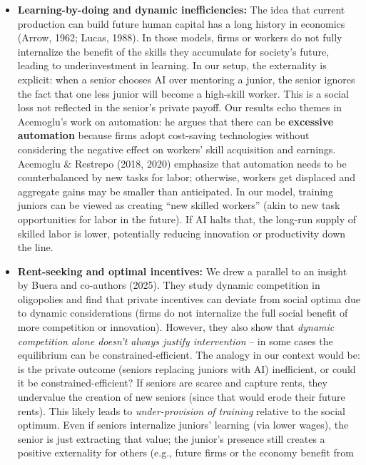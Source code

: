 \documentclass[12pt]{article}
\begin{document}
\begin{itemize}
\item
  \textbf{Learning-by-doing and dynamic inefficiencies:} The idea that
  current production can build future human capital has a long history
  in economics (Arrow, 1962; Lucas, 1988). In those models, firms or
  workers do not fully internalize the benefit of the skills they
  accumulate for society's future, leading to underinvestment in
  learning. In our setup, the externality is explicit: when a senior
  chooses AI over mentoring a junior, the senior ignores the fact that
  one less junior will become a high-skill worker. This is a social loss
  not reflected in the senior's private payoff. Our results echo themes
  in Acemoglu's work on automation: he argues that there can be
  \textbf{excessive automation} because firms adopt cost-saving
  technologies without considering the negative effect on workers' skill
  acquisition and earnings. Acemoglu \& Restrepo (2018, 2020) emphasize
  that automation needs to be counterbalanced by new tasks for labor;
  otherwise, workers get displaced and aggregate gains may be smaller
  than anticipated. In our model, training juniors can be viewed as
  creating ``new skilled workers'' (akin to new task opportunities for
  labor in the future). If AI halts that, the long-run supply of skilled
  labor is lower, potentially reducing innovation or productivity down
  the line.
\item
  \textbf{Rent-seeking and optimal incentives:} We drew a parallel to an
  insight by Buera and co-authors (2025). They study dynamic competition
  in oligopolies and find that private incentives can deviate from
  social optima due to dynamic considerations (firms do not internalize
  the full social benefit of more competition or innovation). However,
  they also show that \emph{dynamic competition alone doesn't always
  justify intervention} -- in some cases the equilibrium can be
  constrained-efficient. The analogy in our context would be: is the
  private outcome (seniors replacing juniors with AI) inefficient, or
  could it be constrained-efficient? If seniors are scarce and capture
  rents, they undervalue the creation of new seniors (since that would
  erode their future rents). This likely leads to \emph{under-provision
  of training} relative to the social optimum. Even if seniors
  internalize juniors' learning (via lower wages), the senior is just
  extracting that value; the junior's presence still creates a positive
  externality for others (e.g., future firms or the economy benefit from

\end{itemize}
\end{document}
